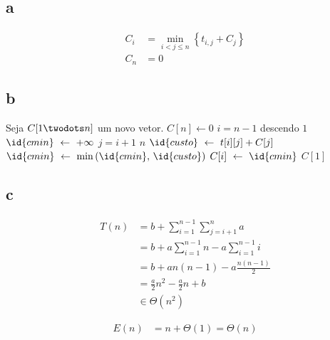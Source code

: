 \subsection{a}

\begin{align*}
    C_i &= \min_{i < j \leq n}\left\{t_{i, j} + C_j\right\} \\
    C_n &= 0
\end{align*}

\subsection{b}

\begin{codebox}
    \li Seja $C[1 \twodots n]$ um novo vetor.
    \li
    \li $C[n] \gets 0$
    \li {} $i = n - 1$ descendo  $1$
        \Do
    \li     $\id{cmin} \gets +\infty$
    \li     {} $j = i + 1$  $n$
            \Do
    \li         $\id{custo} \gets t[i][j] + C[j]$
    \li         $\id{cmin} \gets \min\left(\id{cmin},\, \id{custo}\right)$
            \End
    \li     $C[i] \gets \id{cmin}$
        \End
    \li
    \li {} $C[1]$
\end{codebox}

\subsection{c}

\begin{align*}
    T(n) &= b + \sum_{i = 1}^{n - 1} \sum_{j = i + 1}^n a \\
    &= b + a \sum_{i = 1}^{n - 1} n - a \sum_{i = 1}^{n - 1} i \\
    &= b + a n (n - 1) - a \frac{n (n - 1)}{2} \\
    &= \frac{a}{2} n^2 - \frac{a}{2} n + b \\
    &\in \Theta\left(n^2\right)
\end{align*}

\begin{align*}
    E(n) &= n + \Theta(1) = \Theta(n)
\end{align*}
